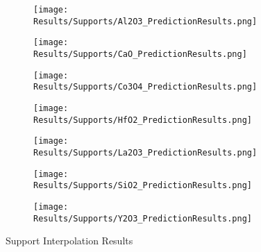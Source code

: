 	\begin{figure}[!htbp]
	    \centering
	    \begin{subfigure}[b]{0.3\textwidth}
	        \centering
	        \texttt{[image: Results/Supports/Al2O3\_PredictionResults.png]}
	        \caption{}
	        \label{fig:non-norm_dist, Al2O3}
	    \end{subfigure}
	    \begin{subfigure}[b]{0.3\textwidth}
	        \centering
	        \texttt{[image: Results/Supports/CaO\_PredictionResults.png]}
	        \caption{}
	        \label{fig:norm_dist, CaO}
	    \end{subfigure}
	    \begin{subfigure}[b]{0.3\textwidth}
	        \centering
	        \texttt{[image: Results/Supports/Co3O4\_PredictionResults.png]}
	        \caption{}
	        \label{fig:norm_dist, Co3O4}
	    \end{subfigure}
	    \begin{subfigure}[b]{0.3\textwidth}
	        \centering
	        \texttt{[image: Results/Supports/HfO2\_PredictionResults.png]}
	        \caption{}
	        \label{fig:norm_dist, HfO2}
	    \end{subfigure}
	    \begin{subfigure}[b]{0.3\textwidth}
	        \centering
	        \texttt{[image: Results/Supports/La2O3\_PredictionResults.png]}
	        \caption{}
	        \label{fig:norm_dist, La2O3}
	    \end{subfigure}
	    \begin{subfigure}[b]{0.3\textwidth}
	        \centering
	        \texttt{[image: Results/Supports/SiO2\_PredictionResults.png]}
	        \caption{}
	        \label{fig:norm_dist, SiO2}
	    \end{subfigure}
	    \begin{subfigure}[b]{0.3\textwidth}
	        \centering
	        \texttt{[image: Results/Supports/Y2O3\_PredictionResults.png]}
	        \caption{}
	        \label{fig:norm_dist, Y2O3}
	    \end{subfigure}
	    \caption{Support Interpolation Results}
	    \label{fig:support exclusion}
	\end{figure}
	\FloatBarrier


